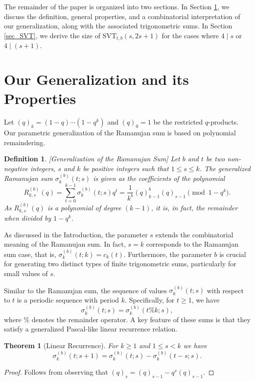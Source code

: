 \documentclass[12pt]{article}
\newtheorem{thm}{Theorem}[subsection]%
\newtheorem{defn}{Definition}[subsection]%
\begin{document}
The remainder of the paper is organized into two sections. In Section \ref{sec_gen}, we discuss the definition, general properties, and a combinatorial interpretation of our generalization, along with the associated trigonometric sums. In Section \ref{sec_SVT}, we derive the size of $\text{SVT}_{t,b}(s, 2s + 1)$ for the cases where $4 \mid s$ or $4 \mid (s + 1)$.


\section{Our Generalization and its Properties}\label{sec_gen}

Let $(q)_{k}=(1-q)\cdots (1-q^{k})$ and $(q)_{0}=1$ be the restricted $q$-products. Our parametric generalization of the Ramanujan sum is based on polynomial remaindering.

\begin{defn}\label{defn_GRS}[Generalization of the Ramanujan Sum]
Let $b$ and $t$ be two non-negative integers, $s$ and $k$ be positive integers such that $1\leq s\leq k$. The generalized Ramanujan sum $\sigma^{(b)}_{k}(t;s)$ is given as the coefficients of the polynomial
$$
R^{(b)}_{k,s}(q) = \sum^{k-1}_{t=0} \sigma_{k}^{(b)}(t;s)q^{t} = \frac{1}{k^{b}}(q)^{b}_{k-1}(q)_{s-1} \pmod{1-q^{k}}.
$$
As \( R_{k,s}^{(b)}(q) \) is a polynomial of degree \( (k-1) \), it is, in fact, the remainder when divided by \( 1 - q^k \).
\end{defn}

As discussed in the Introduction, the parameter \( s \) extends the combinatorial meaning of the Ramanujan sum. In fact, \( s = k \) corresponds to the Ramanujan sum case, that is, \( \sigma_{k}^{(b)}(t;k) = c_{k}(t) \). Furthermore, the parameter \( b \) is crucial for generating two distinct types of finite trigonometric sums, particularly for small values of \( s \).

Similar to the Ramanujan sum, the sequence of values \( \sigma_{k}^{(b)}(t;s) \) with respect to \( t \) is a periodic sequence with period \( k \). Specifically, for \( t \geq 1 \), we have
\[
\sigma_{k}^{(b)}(t;s) = \sigma_{k}^{(b)}(t \% k; s),
\]
where \( \% \) denotes the remainder operator. A key feature of these sums is that they satisfy a generalized Pascal-like linear recurrence relation.


\begin{thm}[Linear Recurrence]\label{linear_recurrence}
For $k\geq 1$ and $1\leq s<k$ we have 
$$
\sigma_{k}^{(b)}(t;s+1)=\sigma_{k}^{(b)}(t;s)-\sigma_{k}^{(b)}(t-s;s).
$$    
\end{thm}
\begin{proof} Follows from observing that 
$
(q)_{s}=(q)_{s-1}-q^{s}(q)_{s-1}. 
$
\end{proof}
\end{document}
